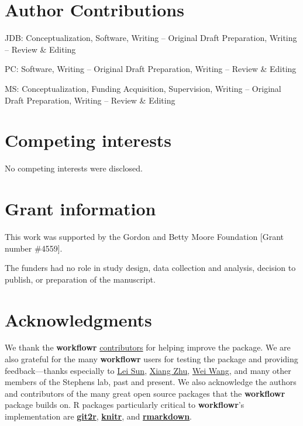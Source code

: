 \documentclass[9pt,a4paper]{extarticle}
\begin{document}
\section*{Author Contributions}

JDB: Conceptualization, Software, Writing – Original Draft Preparation,
Writing – Review \& Editing

PC: Software, Writing – Original Draft Preparation, Writing – Review \&
Editing

MS: Conceptualization, Funding Acquisition, Supervision, Writing –
Original Draft Preparation, Writing – Review \& Editing


\section*{Competing interests}

No competing interests were disclosed.


\section*{Grant information}

This work was supported by the Gordon and Betty Moore Foundation [Grant
number \#4559].

The funders had no role in study design, data collection and analysis,
decision to publish, or preparation of the manuscript.


\section*{Acknowledgments}

We thank the \textbf{workflowr}
\href{https://github.com/jdblischak/workflowr/graphs/contributors}{contributors}
for helping improve the package. We are also grateful for the many
 \textbf{workflowr} users for testing the package and providing feedback---thanks
especially to \href{https://github.com/LSun}{Lei Sun},
\href{https://github.com/xiangzhu}{Xiang Zhu},
\href{https://github.com/NKweiwang}{Wei Wang}, and many other members of
the Stephens lab, past and present. We also acknowledge the authors and
contributors of the many great open source packages that the \textbf{workflowr}
package builds on. R packages particularly critical to \textbf{workflowr}'s
implementation are
\textbf{\href{https://cran.r-project.org/web/packages/git2r/index.html}{git2r}},
\textbf{\href{https://github.com/yihui/knitr}{knitr}}, and
\textbf{\href{http://rmarkdown.rstudio.com/}{rmarkdown}}.

{\small

}
\end{document}
